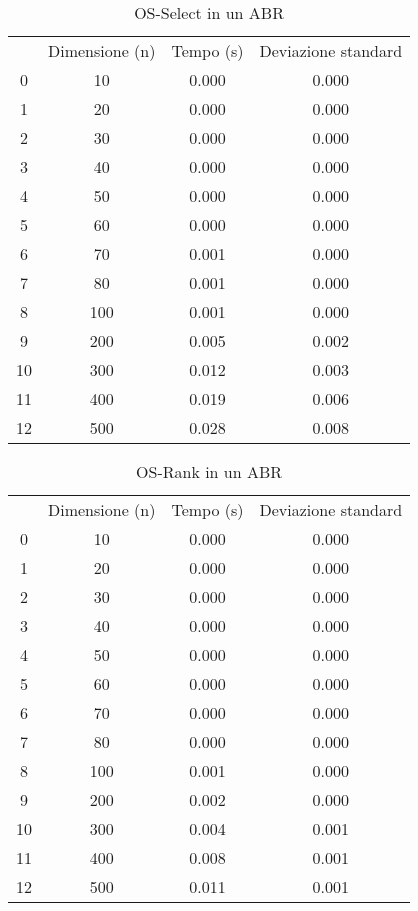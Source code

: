 \begin{table}[H]
\centering
\caption{OS-Select in un ABR}
\label{OS-Select in un ABR}
\begin{tabular}{cccc}
 & Dimensione (n) & Tempo (s) & Deviazione standard \\
0 & 10 & 0.000 & 0.000 \\
\cline{1-4}
1 & 20 & 0.000 & 0.000 \\
\cline{1-4}
2 & 30 & 0.000 & 0.000 \\
\cline{1-4}
3 & 40 & 0.000 & 0.000 \\
\cline{1-4}
4 & 50 & 0.000 & 0.000 \\
\cline{1-4}
5 & 60 & 0.000 & 0.000 \\
\cline{1-4}
6 & 70 & 0.001 & 0.000 \\
\cline{1-4}
7 & 80 & 0.001 & 0.000 \\
\cline{1-4}
8 & 100 & 0.001 & 0.000 \\
\cline{1-4}
9 & 200 & 0.005 & 0.002 \\
\cline{1-4}
10 & 300 & 0.012 & 0.003 \\
\cline{1-4}
11 & 400 & 0.019 & 0.006 \\
\cline{1-4}
12 & 500 & 0.028 & 0.008 \\
\cline{1-4}
\end{tabular}
\end{table}

\begin{table}[H]
\centering
\caption{OS-Rank in un ABR}
\label{OS-Rank in un ABR}
\begin{tabular}{cccc}
 & Dimensione (n) & Tempo (s) & Deviazione standard \\
0 & 10 & 0.000 & 0.000 \\
\cline{1-4}
1 & 20 & 0.000 & 0.000 \\
\cline{1-4}
2 & 30 & 0.000 & 0.000 \\
\cline{1-4}
3 & 40 & 0.000 & 0.000 \\
\cline{1-4}
4 & 50 & 0.000 & 0.000 \\
\cline{1-4}
5 & 60 & 0.000 & 0.000 \\
\cline{1-4}
6 & 70 & 0.000 & 0.000 \\
\cline{1-4}
7 & 80 & 0.000 & 0.000 \\
\cline{1-4}
8 & 100 & 0.001 & 0.000 \\
\cline{1-4}
9 & 200 & 0.002 & 0.000 \\
\cline{1-4}
10 & 300 & 0.004 & 0.001 \\
\cline{1-4}
11 & 400 & 0.008 & 0.001 \\
\cline{1-4}
12 & 500 & 0.011 & 0.001 \\
\cline{1-4}
\end{tabular}
\end{table}
